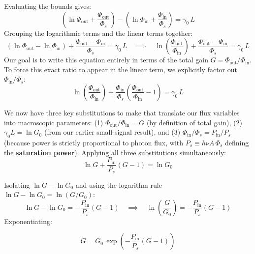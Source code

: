 Evaluating the bounds gives:
\begin{equation*}
    \left(\ln \Phi_\text{out} + \frac{\Phi_\text{out}}{\Phi_s}\right) - \left(\ln \Phi_\text{in} + \frac{\Phi_\text{in}}{\Phi_s}\right) = \gamma_0\,L
\end{equation*}
Grouping the logarithmic terms and the linear terms together:
\begin{equation*}
    \left(\ln \Phi_\text{out} - \ln \Phi_\text{in}\right) + \frac{\Phi_\text{out} - \Phi_\text{in}}{\Phi_s} = \gamma_0\,L
    \quad\implies\quad
    \ln\!\left(\frac{\Phi_\text{out}}{\Phi_\text{in}}\right) + \frac{\Phi_\text{out} - \Phi_\text{in}}{\Phi_s} = \gamma_0\,L
\end{equation*}
Our goal is to write this equation entirely in terms of the total gain $G = \Phi_\text{out}/\Phi_\text{in}$. To force this exact ratio to appear in the linear term, we explicitly factor out $\Phi_\text{in}/\Phi_s$:
\begin{equation*}
    \ln\!\left(\frac{\Phi_\text{out}}{\Phi_\text{in}}\right) + \frac{\Phi_\text{in}}{\Phi_s}\!\left(\frac{\Phi_\text{out}}{\Phi_\text{in}} - 1\right) = \gamma_0\,L
\end{equation*}

We now have three key substitutions to make that translate our flux variables into macroscopic parameters: (1) $\Phi_\text{out}/\Phi_\text{in} = G$ (by definition of total gain), (2) $\gamma_0 L = \ln G_0$ (from our earlier small-signal result), and (3) $\Phi_\text{in}/\Phi_s = P_\text{in}/P_s$ (because power is strictly proportional to photon flux, with $P_s \equiv h\nu A\,\Phi_s$ defining the \textbf{saturation power}). Applying all three substitutions simultaneously:
\begin{equation*}
    \ln G + \frac{P_\text{in}}{P_s}(G - 1) = \ln G_0
\end{equation*}

Isolating $\ln G - \ln G_0$ and using the logarithm rule $\ln G - \ln G_0 = \ln(G/G_0)$:
\begin{equation*}
    \ln G - \ln G_0 = -\frac{P_\text{in}}{P_s}(G-1)
    \quad\implies\quad
    \ln\!\left(\frac{G}{G_0}\right) = -\frac{P_\text{in}}{P_s}(G-1)
\end{equation*}
Exponentiating:
\begin{keyresult}
    \begin{equation}
        G = G_0\,\exp\!\left(-\frac{P_\text{in}}{P_s}(G-1)\right)
    \end{equation}
\end{keyresult}

